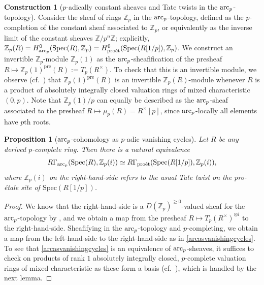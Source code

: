 \documentclass{amsart}
\newcommand{\proet}{\mathrm{pro\acute{e}t}}
\newtheorem{proposition}[theorem]{Proposition}
\theoremstyle{definition}
\newtheorem{construction}[theorem]{Construction}
\newcommand{\spec}{\mathrm{Spec}}
\begin{document}
\begin{construction}[$p$-adically constant sheaves and Tate twists in the $\mathrm{arc}_{{p}}$-topology]
Consider the sheaf of rings $\mathbb{Z}_p$ in the $\mathrm{arc}_{{p}}$-topology, defined as the
$p$-completion of the constant sheaf associated to $\mathbb{Z}_p$, or
equivalently as the inverse limit of the constant sheaves 
$\mathbb{Z}/p^n \mathbb{Z}$; 
explicitly, $\mathbb{Z}_p(R) = H^0_{\arc}( \spec(R), \mathbb{Z}_p) = 
H^0_{\proet}( \spec(R[1/p]), \mathbb{Z}_p)$. 
We construct an invertible $\mathbb{Z}_p$-module $\mathbb{Z}_p(1)$ as the
$\mathrm{arc}_{{p}}$-sheafification of the presheaf 
$R \mapsto \mathbb{Z}_p(1)^{\mathrm{pre}}(R) := T_p(R^{\times})$.  
To check that this is an invertible module, we observe
(cf.~\cite[Prop.~3.30]{BM18}) that 
$\mathbb{Z}_p(1)^{\mathrm{pre}}(R)$ is an invertible
$\mathbb{Z}_p(R)$-module whenever $R$ is a product of absolutely
integrally closed valuation rings of mixed characteristic $(0, p)$.  
Note that $\mathbb{Z}_p(1)/p$ can equally be described as the $\mathrm{arc}_{{p}}$-sheaf 
associated to the presheaf $R \mapsto \mu_p(R) = R^{\times}[p]$, since $\mathrm{arc}_{{p}}$-locally all
elements have $p$th roots. 
\end{construction} 


\begin{proposition}[$\mathrm{arc}_{{p}}$-cohomology as $p$-adic vanishing cycles] 
Let $R$ be any derived $p$-complete ring. Then there is a natural equivalence
\begin{equation} \label{arcasvanishingcycles} R \Gamma_{\arc}( \spec(R), \mathbb{Z}_p(i)) \simeq R \Gamma_{\proet}(
\spec(R[1/p]), \mathbb{Z}_p(i)), \end{equation}
where $\mathbb{Z}_p(i)$ on the right-hand-side refers to the usual Tate twist on
the pro-\'etale site of $\spec(R[1/p])$. 
\label{padicvanishingprop}
\end{proposition} 
\begin{proof} 
We know that the right-hand-side is a $D(\mathbb{Z}_p)^{\geq 0}$-valued sheaf for the $\mathrm{arc}_{{p}}$-topology by
\cite[Cor.~6.17]{BM18}, and
we obtain a map 
from the 
presheaf $ R \mapsto T_p( R^{\times})^{\otimes i}$
to the right-hand-side. 
Sheafifying in the $\mathrm{arc}_{{p}}$-topology and $p$-completing, we obtain a
map from the left-hand-side to the right-hand-side as in
\eqref{arcasvanishingcycles}. 
To see that \eqref{arcasvanishingcycles} is an equivalence of $\mathrm{arc}_{{p}}$-sheaves, 
it suffices to check on 
products of rank $1$ absolutely integrally closed, $p$-complete valuation rings of mixed
characteristic as these form a basis
(cf.~\cite[Prop.~3.29]{BM18}), which is handled by the next lemma.  
\end{proof} 
\end{document}
